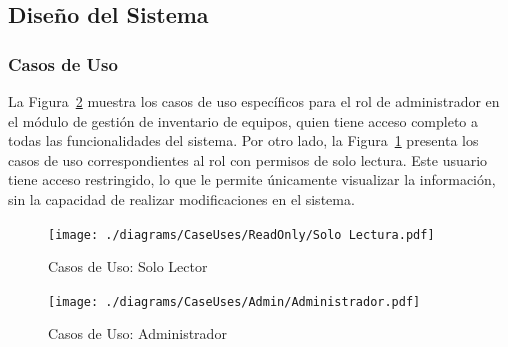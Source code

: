 \documentclass[stu, 12pt, letterpaper, donotrepeattitle, floatsintext, natbib]{apa7}
\begin{document}
\subsection{Diseño del Sistema}
\subsubsection{Casos de Uso}
La Figura~\ref{admin} muestra los casos de uso específicos para el rol de administrador en el módulo de gestión de inventario de equipos,
quien tiene acceso completo a todas las funcionalidades del sistema. Por otro lado, la Figura~\ref{readonly} presenta los casos de uso
correspondientes al rol con permisos de solo lectura. Este usuario tiene acceso restringido, lo que le permite únicamente visualizar la
información, sin la capacidad de realizar modificaciones en el sistema.
\begin{figure}[H]
    \centering
    \caption{Casos de Uso: Solo Lector}\label{readonly}
    \texttt{[image: ./diagrams/CaseUses/ReadOnly/Solo Lectura.pdf]}
\end{figure}
\begin{figure}[H]
    \centering
    \caption{Casos de Uso: Administrador}\label{admin}
    \texttt{[image: ./diagrams/CaseUses/Admin/Administrador.pdf]}
\end{figure}
\end{document}
